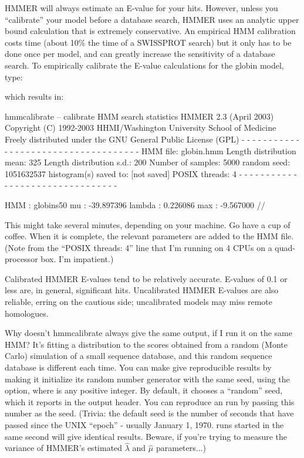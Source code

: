 HMMER will always estimate an E-value for your hits. However, unless
you ``calibrate'' your model before a database search, HMMER uses an
analytic upper bound calculation that is extremely conservative.  An
empirical HMM calibration costs time (about 10\% the time of a
SWISSPROT search) but it only has to be done once per model, and can
greatly increase the sensitivity of a database search. To empirically
calibrate the E-value calculations for the globin model, type:


which results in:
\begin{sreoutput}
hmmcalibrate -- calibrate HMM search statistics
HMMER 2.3 (April 2003)
Copyright (C) 1992-2003 HHMI/Washington University School of Medicine
Freely distributed under the GNU General Public License (GPL)
- - - - - - - - - - - - - - - - - - - - - - - - - - - - - - - - - - - -
HMM file:                 globin.hmm
Length distribution mean: 325
Length distribution s.d.: 200
Number of samples:        5000
random seed:              1051632537
histogram(s) saved to:    [not saved]
POSIX threads:            4
- - - - - - - - - - - - - - - - - - - - - - - - - - - - - - - -

HMM    : globins50
mu     :   -39.897396
lambda :     0.226086
max    :    -9.567000
//
\end{sreoutput}

This might take several minutes, depending on your machine. Go have a
cup of coffee. When it is complete, the relevant parameters are added
to the HMM file.  (Note from the ``POSIX threads: 4'' line that I'm
running on 4 CPUs on a quad-processor box. I'm impatient.)

Calibrated HMMER E-values tend to be relatively accurate. E-values of
0.1 or less are, in general, significant hits. Uncalibrated HMMER
E-values are also reliable, erring on the cautious side; uncalibrated
models may miss remote homologues.

\begin{srefaq}
{Why doesn't hmmcalibrate always give the same output, if I run it on
the same HMM?}  It's fitting a distribution to the scores obtained
from a random (Monte Carlo) simulation of a small sequence database,
and this random sequence database is different each time. You can make
 give reproducible results by making it initialize
its random number generator with the same seed, using the  option, where  is any positive integer. By default, it
chooses a ``random'' seed, which it reports in the output header. You
can reproduce an  run by passing this number as the
seed. (Trivia: the default seed is the number of seconds that have
passed since the UNIX ``epoch'' - usually January 1, 1970.
 runs started in the same second will give
identical results. Beware, if you're trying to measure the variance of
HMMER's estimated $\hat{\lambda}$ and $\hat{\mu}$ parameters...)
\end{srefaq}

